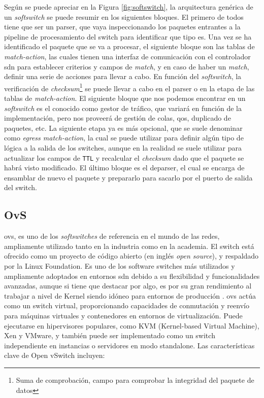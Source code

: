 Según se puede apreciar en la Figura \ref{fig:softswitch}, la arquitectura genérica de un \textit{softswitch} se puede resumir en los siguientes bloques. El primero de todos tiene que ser un parser, que vaya inspeccionando los paquetes entrantes a la pipeline de procesamiento del switch para identificar que tipo es. Una vez se ha identificado el paquete que se va a procesar, el siguiente bloque son las tablas de \textit{match-action}, las cuales tienen una interfaz de comunicación con el controlador \gls{sdn} para establecer criterios y campos de \textit{match}, y en caso de haber un \textit{match}, definir una serie de acciones para llevar a cabo. En función del \textit{softswitch}, la verificación de \textit{checksum}\footnote{Suma de comprobación, campo para comprobar la integridad del paquete de datos} se puede llevar a cabo en el parser o en la etapa de las tablas de \textit{match-action}. El siguiente bloque que nos podemos encontrar en un \textit{softswitch} es el conocido como gestor de tráfico, que variará en función de la implementación, pero nos proveerá de gestión de colas, \gls{qos}, duplicado de paquetes, etc. La siguiente etapa ya es más opcional, que se suele denominar como \textit{egress match-action}, la cual se puede utilizar para definir algún tipo de lógica a la salida de los switches, aunque en la realidad se suele utilizar para actualizar los campos  de \texttt{TTL} y recalcular el \textit{checksum} dado que el paquete se habrá visto modificado. El último bloque es el deparser, el cual se encarga de ensamblar de nuevo el paquete y prepararlo para sacarlo por el puerto de salida del switch.

\subsection{OvS}
\label{subsec:OVS}

\gls{ovs}, es uno de los \textit{softswitches} de referencia en el mundo de las redes, ampliamente utilizado tanto en la industria como en la academia. El switch está ofrecido como un proyecto de código abierto (en inglés \textit{open source}), y respaldado por la Linux Foundation.  Es uno de los software switches más utilizados y ampliamente adoptados en entornos \gls{sdn} debido a su flexibilidad y funcionalidades avanzadas, aunque si tiene que destacar por algo, es por su gran rendimiento al trabajar a nivel de Kernel siendo idóneo para entornos de producción \cite{ovs1}. \gls{ovs} actúa como un switch virtual, proporcionando capacidades de conmutación y reenvío para máquinas virtuales y contenedores en entornos de virtualización. Puede ejecutarse en hipervisores populares, como KVM (Kernel-based Virtual Machine), Xen y VMware, y también puede ser implementado como un switch independiente en instancias o servidores en modo standalone. Las características clave de Open vSwitch incluyen:


